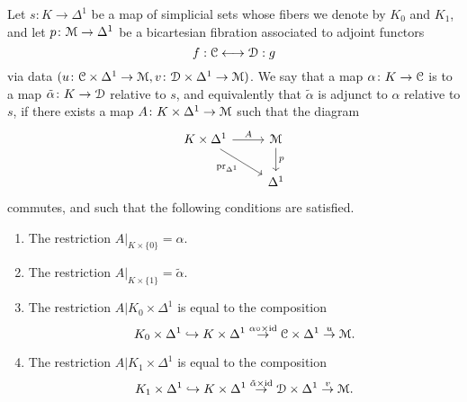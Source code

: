 \documentclass[main.tex]{subfiles}
\begin{document}
\begin{definition}
  \label{def:adjunct_data}
  Let $s\colon K \to \Delta^{1}$ be a map of simplicial sets whose fibers we denote by $K_{0}$ and $K_{1}$, and let $p\colon \mathcal{M} \to \Delta^{1}$ be a bicartesian fibration associated to adjoint functors
  \begin{equation*}
    f : \mathcal{C} \longleftrightarrow \mathcal{D} : g
  \end{equation*}
  via data $(u\colon \mathcal{C} \times \Delta^{1} \to \mathcal{M}, v\colon \mathcal{D} \times \Delta^{1} \to \mathcal{M})$. We say that a map $\alpha\colon K \to \mathcal{C}$ is  to a map $\tilde{\alpha}\colon K \to \mathcal{D}$ relative to $s$, and equivalently that $\tilde{\alpha}$ is adjunct to $\alpha$ relative to $s$, if there exists a map $A\colon K \times \Delta^{1} \to \mathcal{M}$ such that the diagram
  \begin{equation*}
    \begin{tikzcd}
      K \times \Delta^{1}
      \arrow[r, "A"]
      \arrow[dr, swap, "\pr_{\Delta^{1}}"]
      & \category{M}
      \arrow[d, "p"]
      \\
      & \Delta^{1}
    \end{tikzcd}
  \end{equation*}
  commutes, and such that the following conditions are satisfied.
  \begin{enumerate}
    \item The restriction $A|_{K \times \{0\}} = \alpha$.

    \item The restriction $A|_{K \times \{1\}} = \tilde{\alpha}$.

    \item The restriction $A|K_{0} \times \Delta^{1}$ is equal to the composition
      \begin{equation*}
        K_{0} \times \Delta^{1} \hookrightarrow K \times \Delta^{1} \overset{\alpha \circ \times \mathrm{id}}{\to} \mathcal{C} \times \Delta^{1} \overset{u}{\to} \mathcal{M}.
      \end{equation*}

    \item The restriction $A|K_{1} \times \Delta^{1}$ is equal to the composition
      \begin{equation*}
        K_{1} \times \Delta^{1} \hookrightarrow K \times \Delta^{1} \overset{\tilde{\alpha} \times \mathrm{id}}{\to} \mathcal{D} \times \Delta^{1} \overset{v}{\to} \mathcal{M}.
      \end{equation*}
  \end{enumerate}
\end{definition}
\end{document}
